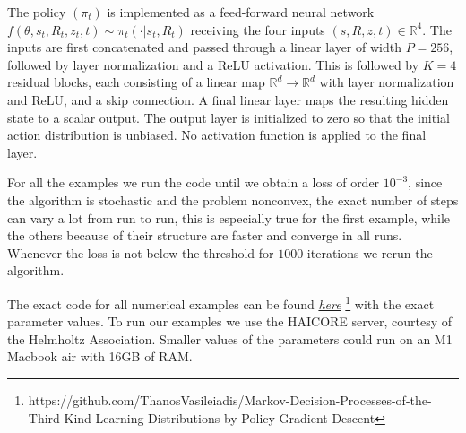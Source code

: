 \documentclass[reqno, 11pt]{amsart}%
\theoremstyle{definition}
\begin{document}
The policy $(\pi_t)$ is implemented as a feed-forward neural network $f(\theta,s_t,R_t,z_t,t) \sim \pi_t(\cdot|s_t,R_t)$
receiving the four inputs $(s,R,z,t)\in\mathbb{R}^4$.
The inputs are first concatenated and passed through a linear layer of width
$P=256$, followed by layer normalization and a ReLU activation.
This is followed by $K=4$ residual blocks, each consisting of a linear map
$\mathbb{R}^d\!\to\!\mathbb{R}^d$ with layer normalization and ReLU, and a skip
connection.  A final linear layer maps the resulting hidden state to a scalar
output.  The output layer is initialized to zero so that
the initial action distribution is unbiased. No activation function is applied to the final layer. 

For all the examples we run the code until we obtain a loss of order $10^{-3}$, since the algorithm is stochastic and the problem nonconvex, the exact number of steps can vary a lot from run to run, this is especially true for the first example, while the others because of their structure are faster and converge in all runs. Whenever the loss is not below the threshold for $1000$ iterations we rerun the algorithm.   

The exact code for all numerical examples can be found \href{https://github.com/ThanosVasileiadis/Markov-Decision-Processes-of-the-Third-Kind-Learning-Distributions-by-Policy-Gradient-Descent}{\emph{here}} \footnote{https://github.com/ThanosVasileiadis/Markov-Decision-Processes-of-the-Third-Kind-Learning-Distributions-by-Policy-Gradient-Descent} with the exact parameter values. To run our examples we use the HAICORE server, courtesy of the Helmholtz Association. Smaller values of the parameters could run on an M1 Macbook air with 16GB of RAM. 
\end{document}

